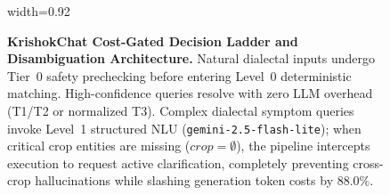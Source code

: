 \begin{figure}[t]
\begin{adjustbox}{width=0.92\textwidth}
\end{adjustbox}
\caption{\textbf{KrishokChat Cost-Gated Decision Ladder and Disambiguation Architecture.} Natural dialectal inputs undergo Tier~0 safety prechecking before entering Level~0 deterministic matching. High-confidence queries resolve with zero LLM overhead (T1/T2 or normalized T3). Complex dialectal symptom queries invoke Level~1 structured NLU (\texttt{gemini-2.5-flash-lite}); when critical crop entities are missing ($crop=\emptyset$), the pipeline intercepts execution to request active clarification, completely preventing cross-crop hallucinations while slashing generation token costs by $88.0\%$.}
\label{fig:system_architecture}
\end{figure}
